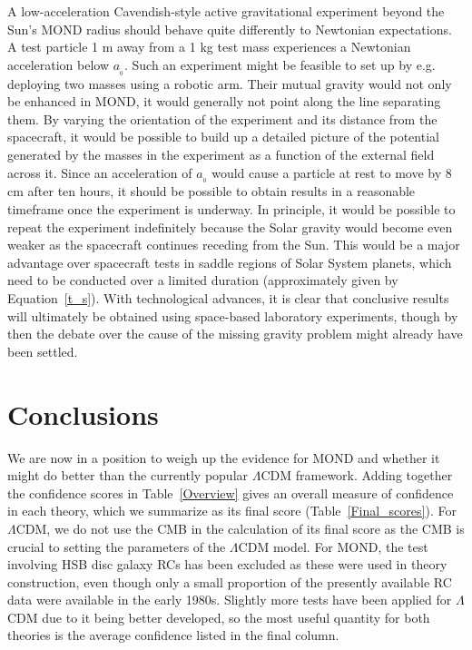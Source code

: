 \documentclass[fleqn,usenatbib,useAMS]{mnras} %
\begin{document}
A low-acceleration Cavendish-style active gravitational experiment beyond the Sun's MOND radius should behave quite differently to Newtonian expectations. A test particle 1 m away from a 1 kg test mass experiences a Newtonian acceleration below $a_{_0}$. Such an experiment might be feasible to set up by e.g. deploying two masses using a robotic arm. Their mutual gravity would not only be enhanced in MOND, it would generally not point along the line separating them. By varying the orientation of the experiment and its distance from the spacecraft, it would be possible to build up a detailed picture of the potential generated by the masses in the experiment as a function of the external field across it. Since an acceleration of $a_{_0}$ would cause a particle at rest to move by 8 cm after ten hours, it should be possible to obtain results in a reasonable timeframe once the experiment is underway. In principle, it would be possible to repeat the experiment indefinitely because the Solar gravity would become even weaker as the spacecraft continues receding from the Sun. This would be a major advantage over spacecraft tests in saddle regions of Solar System planets, which need to be conducted over a limited duration (approximately given by Equation~\ref{t_s}). With technological advances, it is clear that conclusive results will ultimately be obtained using space-based laboratory experiments, though by then the debate over the cause of the missing gravity problem might already have been settled.





\section{Conclusions}
\label{Conclusions}

We are now in a position to weigh up the evidence for MOND and whether it might do better than the currently popular $\Lambda$CDM framework. Adding together the confidence scores in Table~\ref{Overview} gives an overall measure of confidence in each theory, which we summarize as its final score (Table~\ref{Final_scores}). For $\Lambda$CDM, we do not use the CMB in the calculation of its final score as the CMB is crucial to setting the parameters of the $\Lambda$CDM model. For MOND, the test involving HSB disc galaxy RCs has been excluded as these were used in theory construction, even though only a small proportion of the presently available RC data were available in the early 1980s. Slightly more tests have been applied for $\Lambda$CDM due to it being better developed, so the most useful quantity for both theories is the average confidence listed in the final column.
\end{document}
